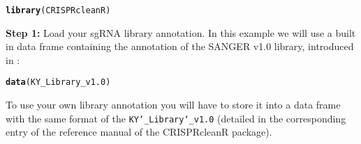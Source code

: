 \documentclass{article}\usepackage[]{graphicx}\usepackage[]{color}
\makeatletter
\newcommand{\hlstd}[1]{\textcolor[rgb]{0.345,0.345,0.345}{#1}}%
\newcommand{\hlkwd}[1]{\textcolor[rgb]{0.737,0.353,0.396}{\textbf{#1}}}%
\newenvironment{kframe}{%
 \def\at@end@of@kframe{}%
 \ifinner\ifhmode%
  \def\at@end@of@kframe{\end{minipage}}%
  \begin{minipage}{\columnwidth}%
 \fi\fi%
 \def\FrameCommand##1{\hskip\@totalleftmargin \hskip-\fboxsep
 \colorbox{shadecolor}{##1}\hskip-\fboxsep
     \hskip-\linewidth \hskip-\@totalleftmargin \hskip\columnwidth}%
 \MakeFramed {\advance\hsize-\width
   \@totalleftmargin\z@ \linewidth\hsize
   \@setminipage}}%
 {\par\unskip\endMakeFramed%
 \at@end@of@kframe}
\newenvironment{knitrout}{}{} %
\makeatother
\begin{document}
\begin{knitrout}
\color{fgcolor}\begin{kframe}
\begin{alltt}
    \hlkwd{library}\hlstd{(CRISPRcleanR)}
\end{alltt}


{\ttfamily\noindent\itshape\color{messagecolor}{\#\# Loading required package: stringr}}

{\ttfamily\noindent\itshape\color{messagecolor}{\#\# Loading required package: DNAcopy}}

{\ttfamily\noindent\itshape\color{messagecolor}{\#\# Loading required package: pROC}}

{\ttfamily\noindent\itshape{}}

{\ttfamily\noindent\itshape\color{messagecolor}{\#\# \\\#\# Attaching package: 'pROC'}}

{\ttfamily\noindent\itshape\color{messagecolor}{\#\# The following objects are masked from 'package:stats':\\\#\# \\\#\#\ \ \ \  cov, smooth, var}}

{\ttfamily\noindent\itshape\color{messagecolor}{\#\# Loading required package: pracma}}

{\ttfamily\noindent\itshape\color{messagecolor}{\#\# Loading required package: PRROC}}\end{kframe}
\end{knitrout}


%
\textbf{Step 1:} Load your sgRNA library annotation. In this example we will use a built in data frame containing the annotation of the SANGER v1.0 library, introduced in \cite{Tzelepis:2016ix}:
\begin{knitrout}
\color{fgcolor}\begin{kframe}
\begin{alltt}
\hlkwd{data}\hlstd{(KY_Library_v1.0)}
\end{alltt}
\end{kframe}
\end{knitrout}
%
To use your own library annotation you will have to store it into a data frame with the same format of the \texttt{KY\char`_Library\char`_v1.0} (detailed in the corresponding entry of the reference manual of the CRISPRcleanR package).\\
\end{document}

